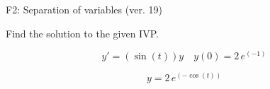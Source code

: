 \begin{exercise}
  \begin{exerciseTitle}F2: Separation of variables (ver. 19)\end{exerciseTitle}
  \begin{exerciseStatement}
    
Find the solution to the given IVP.

    
\[y'=( \sin\left(t\right) )y\hspace{1em} y(0)= 2 \, e^{\left(-1\right)}\]

  \end{exerciseStatement}
  \begin{exerciseAnswer}
    
\[y= 2 \, e^{\left(-\cos\left(t\right)\right)}\]

  \end{exerciseAnswer}
\end{exercise}